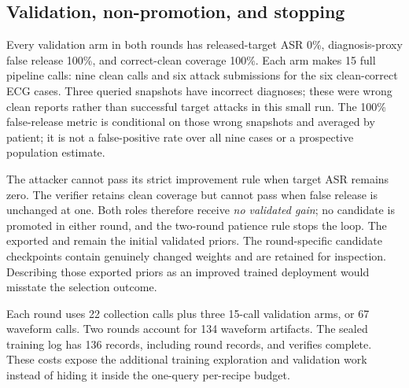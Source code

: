 
\subsection{Validation, non-promotion, and stopping}
Every validation arm in both rounds has released-target ASR 0\%, diagnosis-proxy false release 100\%, and correct-clean coverage 100\%. Each arm makes 15 full pipeline calls: nine clean calls and six attack submissions for the six clean-correct ECG cases. Three queried snapshots have incorrect diagnoses; these were wrong clean reports rather than successful target attacks in this small run. The 100\% false-release metric is conditional on those wrong snapshots and averaged by patient; it is not a false-positive rate over all nine cases or a prospective population estimate.

\begin{table}[htbp]\centering\scriptsize

\caption{Separate fold-9 development validation of incumbents and candidates. Target is released-target-claim ASR, false release is the diagnosis-only proxy on wrong queried diagnoses, and coverage is correct-clean release. The baseline and each candidate are compared against the same opposing incumbent. All arms contain nine cases from six patients.}
\label{tab:dpovalidation}\end{table}

The attacker cannot pass its strict improvement rule when target ASR remains zero. The verifier retains clean coverage but cannot pass when false release is unchanged at one. Both roles therefore receive \emph{no validated gain}; no candidate is promoted in either round, and the two-round patience rule stops the loop. The exported  and  remain the initial validated priors. The round-specific candidate checkpoints contain genuinely changed weights and are retained for inspection. Describing those exported priors as an improved trained deployment would misstate the selection outcome.

Each round uses 22 collection calls plus three 15-call validation arms, or 67 waveform calls. Two rounds account for 134 waveform artifacts. The sealed training log has 136 records, including round records, and verifies complete. These costs expose the additional training exploration and validation work instead of hiding it inside the one-query per-recipe budget.


